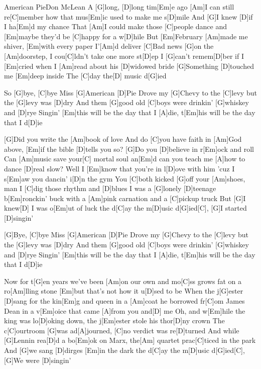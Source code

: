 \documentclass[../main.tex]{subfiles}
\begin{document}
\begin{song}{American Pie}{Don McLean}{}
A [G]long, [D]long tim[Em]e ago
[Am]I can still re[C]member how that mus[Em]ic used to make me s[D]mile
And [G]I knew [D]if I ha[Em]d my chance
That [Am]I could make those [C]people dance and [Em]maybe they'd be [C]happy for a w[D]hile
But [Em]February [Am]made me shiver, [Em]with every paper I'[Am]d deliver
[C]Bad news [G]on the [Am]doorstep, I cou[C]ldn't take one more st[D]ep
I [G]can't remem[D]ber if I [Em]cried when I [Am]read about his [D]widowed bride
[G]Something [D]touched me [Em]deep inside
The [C]day the[D] music d[G]ied

So [G]bye, [C]bye Miss [G]American [D]Pie
Drove my [G]Chevy to the [C]levy but the [G]levy was [D]dry
And them [G]good old [C]boys were drinkin' [G]whiskey and [D]rye
Singin' [Em]this will be the day that I [A]die, t[Em]his will be the day that I d[D]ie

[G]Did you write the [Am]book of love
And do [C]you have faith in [Am]God above, [Em]if the bible [D]tells you so?
[G]Do you [D]believe in r[Em]ock and roll
Can [Am]music save your[C] mortal soul an[Em]d can you teach me [A]how to dance [D]real slow?
Well I [Em]know that you're in l[D]ove with him 'cuz I s[Em]aw you dancin' i[D]n the gym
You [C]both kicked [G]off your [Am]shoes, man I [C]dig those rhythm and [D]blues
I was a [G]lonely [D]teenage b[Em]ronckin' buck with a [Am]pink carnation and a [C]pickup truck
But [G]I knew[D] I was o[Em]ut of luck the d[C]ay the m[D]usic d[G]ied[C],  
[G]I started [D]singin'

[G]Bye, [C]bye Miss [G]American [D]Pie
Drove my [G]Chevy to the [C]levy but the [G]levy was [D]dry
And them [G]good old [C]boys were drinkin' [G]whiskey and [D]rye
Singin' [Em]this will be the day that I [A]die, t[Em]his will be the day that I d[D]ie

Now for t[G]en years we've been [Am]on our own
and mo[C]ss grows fat on a ro[Am]lling stone [Em]but that's not how it u[D]sed to be
When the j[G]ester [D]sang for the kin[Em]g and queen
in a [Am]coat he borrowed fr[C]om James Dean in a v[Em]oice that came [A]from you and[D] me
Oh, and w[Em]hile the king was lo[D]oking down, the j[Em]ester stole his thor[D]ny crown
The c[C]ourtroom [G]was ad[A]journed, [C]no verdict was re[D]turned
And while [G]Lennin rea[D]d a bo[Em]ok on Marx, the[Am] quartet prac[C]ticed in the park
And [G]we sang [D]dirges [Em]in the dark the d[C]ay the m[D]usic d[G]ied[C],  
[G]We were [D]singin'\pagebreak


\end{song}
\end{document}
